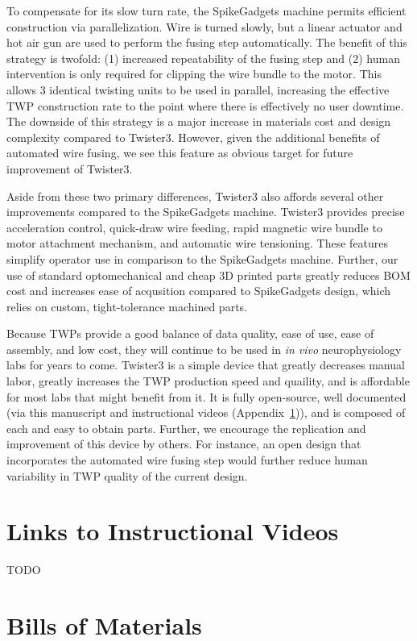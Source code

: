 \documentclass[11pt,a4paper]{article}
\begin{document}
To compensate for its slow turn rate, the SpikeGadgets machine permits
efficient construction via parallelization. Wire is turned slowly, but a linear
actuator and hot air gun are used to perform the fusing step automatically. The
benefit of this strategy is twofold: (1) increased repeatability of the fusing
step and (2) human intervention is only required for clipping the wire bundle
to the motor. This allows 3 identical twisting units to be used in parallel,
increasing the effective TWP construction rate to the point where there is
effectively no user downtime. The downside of this strategy is a major increase
in materials cost and design complexity compared to Twister3. However, given
the additional benefits of automated wire fusing, we see this feature as
obvious target for future improvement of Twister3.

Aside from these two primary differences, Twister3 also affords several other
improvements compared to the SpikeGadgets machine. Twister3 provides precise
acceleration control, quick-draw wire feeding, rapid magnetic wire bundle to
motor attachment mechanism, and automatic wire tensioning. These features
simplify operator use in comparison to the SpikeGadgets machine. Further, our
use of standard optomechanical and cheap 3D printed parts greatly reduces BOM
cost and increases ease of acqusition compared to SpikeGadgets design, which
relies on custom, tight-tolerance machined parts.

Because TWPs provide a good balance of data quality, ease of use, ease of
assembly, and low cost, they will continue to be used in \textit{in vivo}
neurophysiology labs for years to come. Twister3 is a simple device that
greatly decreases manual labor, greatly increases the TWP production speed and
quaility, and is affordable for most labs that might benefit from it. It is
fully open-source, well documented (via this manuscript and instructional
videos (Appendix~\ref{s:videos})), and is composed of each and easy to obtain
parts. Further, we encourage the replication and improvement of this device by
others. For instance, an open design that incorporates the automated wire
fusing step would further reduce human variability in TWP quality of the
current design.

\medskip




\newpage

\begin{appendices}

\section{Links to Instructional Videos} \label{s:videos}

TODO

\section{Bills of Materials} \label{s:boms}





\end{appendices}
\end{document}
